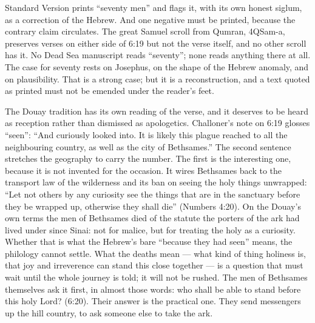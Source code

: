 Standard Version prints ``seventy men'' and flags it, with its own honest
siglum, as a correction of the Hebrew. And one negative must be printed,
because the contrary claim circulates. The great Samuel scroll from Qumran,
4QSam-a, preserves verses on either side of 6:19 but not the verse itself,
and no other scroll has it. No Dead Sea manuscript reads ``seventy''; none
reads anything there at all.
The case for seventy rests on Josephus, on the shape of the Hebrew anomaly,
and on plausibility. That is a strong case; but it is a reconstruction,
and a text quoted as printed must not be emended under the reader's feet.

The Douay tradition has its own reading of the verse, and it deserves to be
heard as reception rather than dismissed as apologetics. Challoner's note on
6:19 glosses ``seen'': ``And curiously looked into. It is likely this plague
reached to all the neighbouring country, as well as the city of
Bethsames.'' The second sentence stretches the
geography to carry the number. The first is the interesting one, because it
is not invented for the occasion. It wires Bethsames back to the transport
law of the wilderness and its ban on seeing the holy things unwrapped:
``Let not others by any curiosity
see the things that are in the sanctuary before they be wrapped up,
otherwise they shall die''
(Numbers 4:20). On the Douay's own terms the men of Bethsames died of the
statute the porters of the ark had lived under since Sinai: not for malice,
but for treating the holy as a curiosity. Whether that is what the Hebrew's
bare ``because they had seen'' means, the philology cannot settle. What
the deaths mean --- what kind of thing holiness is, that joy and
irreverence can stand this close together --- is a question that must wait
until the whole journey is told; it will not be rushed. The men of
Bethsames themselves ask it first, in almost those words: who shall be
able to stand before this holy Lord? (6:20). Their
answer is the practical one. They send messengers up the hill country, to
ask someone else to take the ark.

